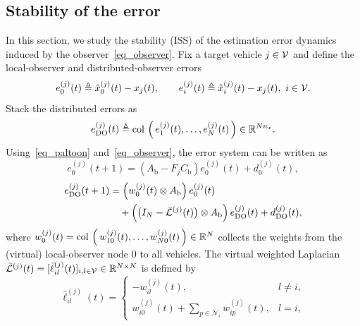 \vspace*{-0.1cm}
\subsection{Stability of the error}\label{subsec_Prove}
\vspace*{-0.2cm}
In this section, we study the stability (ISS) of the estimation error dynamics induced by the observer~\eqref{eq_observer}.
Fix a target vehicle $j\in\mathcal{V}$ and define the local-observer and distributed-observer errors
\begin{equation}\label{eq:def_errors}
e_0^{(j)}(t)\triangleq \hat{x}_0^{(j)}(t)-x_j(t),\qquad
e_i^{(j)}(t)\triangleq \hat{x}_i^{(j)}(t)-x_j(t),\ i\in\mathcal{V}.
\end{equation}
Stack the distributed errors as
\begin{equation}\label{eq:def_eDO}
e_{\mathrm{DO}}^{(j)}(t)\triangleq \mathop{{\rm col}\,\left(\,e_1^{(j)}(t),\ldots,e_N^{(j)}(t)\,\right)}\in\mathbb{R}^{Nn_x}.
\end{equation}
Using~\eqref{eq_paltoon} and~\eqref{eq_observer}, the error system can be written as
\begin{equation}\label{eq_e0}
e_0^{(j)}(t+1)=\left(A_{\text{b}}-F_jC_{\text{b}}\right)e_0^{(j)}(t)+d_0^{(j)}(t),
\end{equation}
\begin{align}\label{eq_error}
\small
e_{\mathrm{DO}}^{(j)}(t+1)
&=\Big(w_{0}^{(j)}(t)\otimes A_{\text{b}}\Big)\,e_0^{(j)}(t) \notag\\
&\quad+\Big(\big(I_{N}-\bar{\mathcal{L}}^{(j)}(t)\big)\otimes A_{\text{b}}\Big)\,e_{\mathrm{DO}}^{(j)}(t)
+d_{\mathrm{DO}}^{(j)}(t),
\end{align}
where $w_{0}^{(j)}(t)=\mathop{{\rm col}\,\left(\,w_{10}^{(j)}(t),\ldots,w_{N0}^{(j)}(t)\,\right)}\in\mathbb{R}^{N}$ collects the weights from the (virtual) local-observer node $0$ to all vehicles.
The virtual weighted Laplacian $\bar{\mathcal{L}}^{(j)}(t)=[\bar{\ell}^{(j)}_{il}(t)]_{i,l\in\mathcal{V}}\in\mathbb{R}^{N\times N}$ is defined by
\begin{equation}\label{eq:def_Lbar}
\bar{\ell}^{(j)}_{il}(t)=
\begin{cases}
-w_{il}^{(j)}(t), & l\neq i,\\[0.5ex]
 w_{i0}^{(j)}(t)+\displaystyle\sum_{p\in\mathcal{N}_i} w_{ip}^{(j)}(t), & l=i,
\end{cases}
\end{equation}
